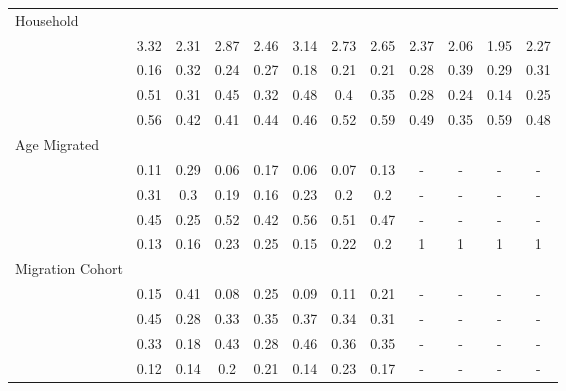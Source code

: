 \documentclass[
]{article}
\begin{document}
\begin{landscape}
\begin{table}[ht]
\begin{threeparttable}
\begin{tabular}{>{\raggedright\arraybackslash}p{3.2cm}|lcccccc|cccc}
  Household &  &  &  &  &  &  &  &  &  &  &  \\ 
  \multicolumn{1}{>{\raggedleft\arraybackslash}p{2.7cm}|}{\makebox[2.7cm][r]{Household Size }}& 3.32 & 2.31 & 2.87 & 2.46 & 3.14 & 2.73 & 2.65 & 2.37 & 2.06 & 1.95 & 2.27 \\ 
  \multicolumn{1}{>{\raggedleft\arraybackslash}p{2.2cm}|}{\makebox[2.2cm][r]{Lives Alone }}& 0.16 & 0.32 & 0.24 & 0.27 & 0.18 & 0.21 & 0.21 & 0.28 & 0.39 & 0.29 & 0.31 \\ 
  \multicolumn{1}{>{\raggedleft\arraybackslash}p{2.9cm}|}{\makebox[2.9cm][r]{Lives with Child }}& 0.51 & 0.31 & 0.45 & 0.32 & 0.48 & 0.4 & 0.35 & 0.28 & 0.24 & 0.14 & 0.25 \\ 
  \multicolumn{1}{>{\raggedleft\arraybackslash}p{3.4cm}|}{\makebox[3.4cm][r]{Married/Cohabiting }}& 0.56 & 0.42 & 0.41 & 0.44 & 0.46 & 0.52 & 0.59 & 0.49 & 0.35 & 0.59 & 0.48 \\ 
  Age Migrated &  &  &  &  &  &  &  &  &  &  &  \\ 
  \multicolumn{1}{>{\raggedleft\arraybackslash}p{2.4cm}|}{\makebox[2.4cm][r]{Less than 15 }}& 0.11 & 0.29 & 0.06 & 0.17 & 0.06 & 0.07 & 0.13 & - & - & - & - \\ 
  \multicolumn{1}{>{\raggedleft\arraybackslash}p{1.6cm}|}{\makebox[1.6cm][r]{15 - 23 }}& 0.31 & 0.3 & 0.19 & 0.16 & 0.23 & 0.2 & 0.2 & - & - & - & - \\ 
  \multicolumn{1}{>{\raggedleft\arraybackslash}p{1.6cm}|}{\makebox[1.6cm][r]{24 - 49 }}& 0.45 & 0.25 & 0.52 & 0.42 & 0.56 & 0.51 & 0.47 & - & - & - & - \\ 
  \multicolumn{1}{>{\raggedleft\arraybackslash}p{2.6cm}|}{\makebox[2.6cm][r]{50 and Above }}& 0.13 & 0.16 & 0.23 & 0.25 & 0.15 & 0.22 & 0.2 & 1 & 1 & 1 & 1 \\ 
  Migration Cohort &  &  &  &  &  &  &  &  &  &  &  \\ 
  \multicolumn{1}{>{\raggedleft\arraybackslash}p{2.3cm}|}{\makebox[2.3cm][r]{Before 1965 }}& 0.15 & 0.41 & 0.08 & 0.25 & 0.09 & 0.11 & 0.21 & - & - & - & - \\ 
  \multicolumn{1}{>{\raggedleft\arraybackslash}p{2.2cm}|}{\makebox[2.2cm][r]{1965 - 1979 }}& 0.45 & 0.28 & 0.33 & 0.35 & 0.37 & 0.34 & 0.31 & - & - & - & - \\ 
  \multicolumn{1}{>{\raggedleft\arraybackslash}p{2.2cm}|}{\makebox[2.2cm][r]{1980 - 1999 }}& 0.33 & 0.18 & 0.43 & 0.28 & 0.46 & 0.36 & 0.35 & - & - & - & - \\ 
  \multicolumn{1}{>{\raggedleft\arraybackslash}p{2.1cm}|}{\makebox[2.1cm][r]{After 1999 }}& 0.12 & 0.14 & 0.2 & 0.21 & 0.14 & 0.23 & 0.17 & - & - & - & - \\ 

\end{tabular}
\end{threeparttable}
\end{table}
\end{landscape}
\end{document}
